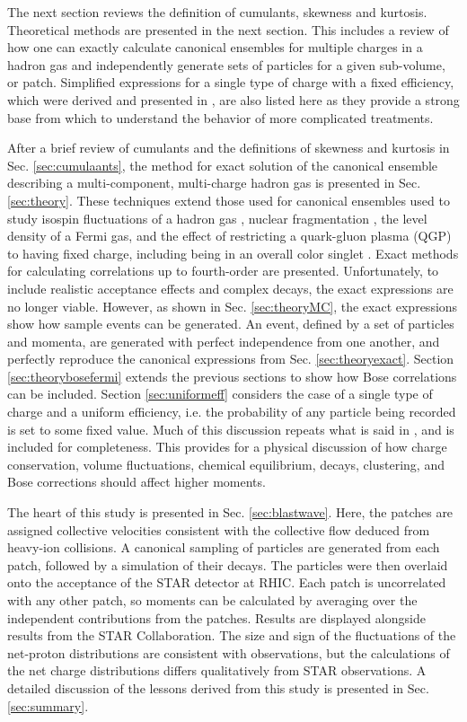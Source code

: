 \documentclass[aps,prc,nofootinbib,showpacs,superscriptaddress,groupedaddress]{revtex4-1}
\begin{document}
The next section reviews the definition of cumulants, skewness and kurtosis. Theoretical methods are presented in the next section. This includes a review of how one can exactly calculate canonical ensembles for multiple charges in a hadron gas and independently generate sets of particles for a given sub-volume, or patch.  Simplified expressions for a single type of charge with a fixed efficiency, which were derived and presented in \cite{Savchuk:2019xfg}, are also listed here as they provide a strong base from which to understand the behavior of more complicated treatments.

After a brief review of cumulants and the definitions of skewness and kurtosis in Sec. \ref{sec:cumulaants}, the method for exact solution of the canonical ensemble describing a multi-component, multi-charge hadron gas is presented in Sec. \ref{sec:theory}. These techniques extend those used for canonical ensembles used to study isospin fluctuations of a hadron gas \cite{}, nuclear fragmentation \cite{}, the level density of a Fermi gas, and the effect of restricting a quark-gluon plasma (QGP) to having fixed charge, including being in an overall color singlet \cite{}. Exact methods for calculating correlations up to fourth-order are presented. Unfortunately, to include realistic acceptance effects and complex decays, the exact expressions are no longer viable. However, as shown in Sec. \ref{sec:theoryMC}, the exact expressions show how sample events can be generated. An event, defined by a set of particles and momenta, are generated with perfect independence from one another, and perfectly reproduce the canonical expressions from Sec. \ref{sec:theoryexact}. Section \ref{sec:theorybosefermi} extends the previous sections to show how Bose correlations can be included. Section \ref{sec:uniformeff} considers the case of a single type of charge and a uniform efficiency, i.e. the probability of any particle being recorded is set to some fixed value. Much of this discussion repeats what is said in \cite{Savchuck:2019xfg}, and is included for completeness. This provides for a physical discussion of how charge conservation, volume fluctuations, chemical equilibrium, decays, clustering, and Bose corrections should affect higher moments.

The heart of this study is presented in Sec. \ref{sec:blastwave}. Here, the patches are assigned collective velocities consistent with the collective flow deduced from heavy-ion collisions. A canonical sampling of particles are generated from each patch, followed by a simulation of their decays. The particles were then overlaid onto the acceptance of the STAR detector at RHIC. Each patch is uncorrelated with any other patch, so moments can be calculated by averaging over the independent contributions from the patches. Results are displayed alongside results from the STAR Collaboration. The size and sign of the fluctuations of the net-proton distributions are consistent with observations, but the calculations of the net charge distributions differs qualitatively from STAR observations. A detailed discussion of the lessons derived from this study is presented in Sec. \ref{sec:summary}.
\end{document}
